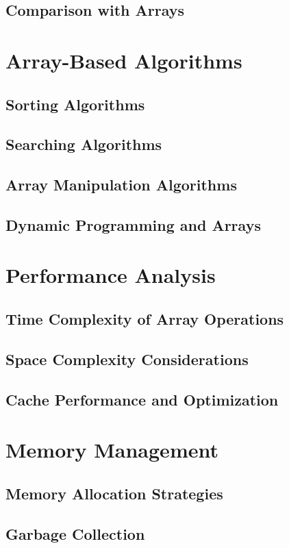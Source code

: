 \documentclass[12pt, oneside]{book}
\begin{document}
\section{Comparison with Arrays}

\chapter{Array-Based Algorithms}
\section{Sorting Algorithms}
\section{Searching Algorithms}
\section{Array Manipulation Algorithms}
\section{Dynamic Programming and Arrays}

\chapter{Performance Analysis}
\section{Time Complexity of Array Operations}
\section{Space Complexity Considerations}
\section{Cache Performance and Optimization}

\chapter{Memory Management}
\section{Memory Allocation Strategies}
\section{Garbage Collection}
\end{document}
